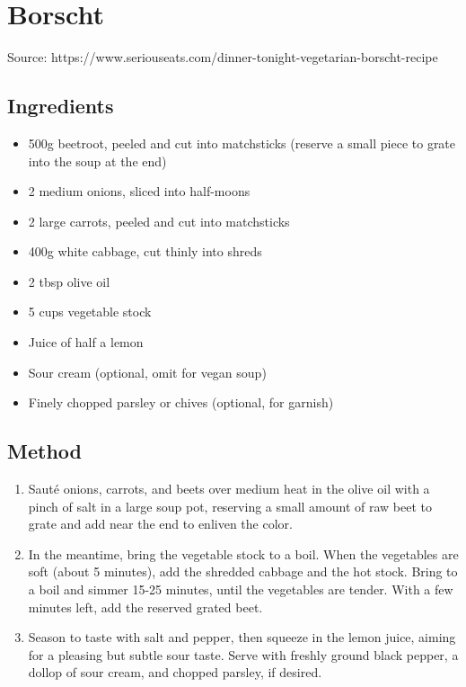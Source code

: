 \section{Borscht}


Source: https://www.seriouseats.com/dinner-tonight-vegetarian-borscht-recipe

\subsection{Ingredients}

\begin{itemize}
    \item 500g beetroot, peeled and cut into matchsticks (reserve a small piece to grate into the soup at the end)
    \item 2 medium onions, sliced into half-moons
    \item 2 large carrots, peeled and cut into matchsticks
    \item 400g white cabbage, cut thinly into shreds
    \item 2 tbsp olive oil
    \item 5 cups vegetable stock
    \item Juice of half a lemon
    \item Sour cream (optional, omit for vegan soup)
    \item Finely chopped parsley or chives (optional, for garnish)
\end{itemize}

\subsection{Method}

\begin{enumerate}
    \item Sauté onions, carrots, and beets over medium heat in the olive oil with a pinch of salt in a large soup pot, reserving a small amount of raw beet to grate and add near the end to enliven the color.
    \item In the meantime, bring the vegetable stock to a boil. When the vegetables are soft (about 5 minutes), add the shredded cabbage and the hot stock. Bring to a boil and simmer 15-25 minutes, until the vegetables are tender. With a few minutes left, add the reserved grated beet.    
    \item Season to taste with salt and pepper, then squeeze in the lemon juice, aiming for a pleasing but subtle sour taste. Serve with freshly ground black pepper, a dollop of sour cream, and chopped parsley, if desired.
\end{enumerate}
